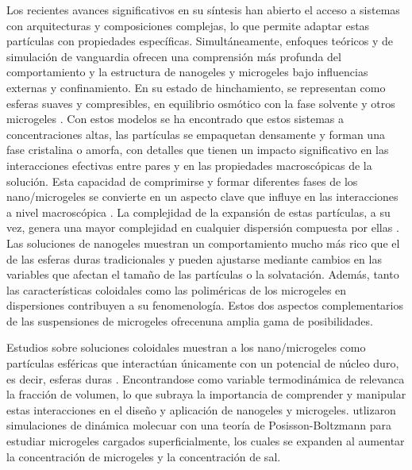 	Los recientes avances significativos en su s\'intesis han abierto el acceso a sistemas con arquitecturas y composiciones complejas, lo que permite adaptar estas part\'iculas  con propiedades espec\'ificas. Simult\'aneamente, enfoques te\'oricos y de simulaci\'on de vanguardia ofrecen una comprensi\'on m\'as profunda del comportamiento y la estructura de nanogeles y microgeles bajo influencias externas y confinamiento. En su estado de hinchamiento, se representan como esferas suaves y compresibles, en equilibrio osm\'otico con la fase solvente y otros microgeles \cite{scheffold2020pathways}. 
	Con estos modelos se ha encontrado que estos sistemas a concentraciones altas, las part\'iculas se empaquetan densamente y forman una fase cristalina o amorfa, con detalles que tienen un impacto significativo en las interacciones efectivas entre pares y en las propiedades macrosc\'opicas de la soluci\'on. Esta capacidad de comprimirse y formar diferentes fases de los nano/microgeles se convierte en un aspecto clave que influye en las interacciones a nivel macrosc\'opica \cite{scotti2022softness,scheffold2020pathways}.
	La complejidad de la expansi\'on de estas part\'iculas, a su vez, genera una mayor complejidad en cualquier dispersi\'on compuesta por ellas \cite{lyon2012polymer}. Las soluciones de nanogeles muestran un comportamiento mucho m\'as rico que el de las esferas duras tradicionales y pueden ajustarse mediante cambios en las variables que afectan el tama\~no de las part\'iculas o la solvataci\'on. Adem\'as, tanto las caracter\'isticas coloidales como las polim\'ericas de los microgeles en dispersiones contribuyen a su fenomenolog\'ia. Estos dos aspectos complementarios de las suspensiones de microgeles ofrecenuna amplia gama de posibilidades.
	
	Estudios sobre soluciones coloidales muestran a los nano/microgeles como part\'iculas esf\'ericas que interact\'uan \'unicamente con un potencial de n\'ucleo duro, es decir, esferas duras \cite{karg2019nanogels}. Encontrandose como variable termodin\'amica de relevanca la fracci\'on de volumen, lo que subraya la importancia de comprender y manipular estas interacciones en el dise\~no y aplicaci\'on de nanogeles y microgeles.
	\citet{alziyadi2023osmotic} utlizaron simulaciones de din\'amica molecuar con una teor\'ia de Posisson-Boltzmann para estudiar microgeles cargados superficialmente, los cuales se expanden al aumentar la concentraci\'on de microgeles y la concentraci\'on de sal.%
	
